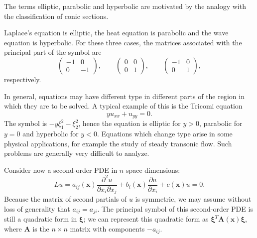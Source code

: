 The terms elliptic, parabolic and hyperbolic are motivated by the analogy with the classification of conic sections.

\begin{Example}
\label{ex:classical-pde-types}
Laplace's equation is elliptic, the heat equation is parabolic and the wave equation is hyperbolic. For these three cases, the matrices associated with the principal part of the symbol are
\begin{equation}\label{eq:classical-principal-matrices}
\begin{pmatrix}-1&0\\0&-1\end{pmatrix},\qquad\begin{pmatrix}0&0\\0&1\end{pmatrix},\qquad\begin{pmatrix}-1&0\\0&1\end{pmatrix},
\end{equation}
respectively.
\end{Example}

\begin{Example}
\label{ex:tricomi-mixed-type}
In general, equations may have different type in different parts of the region in which they are to be solved. A typical example of this is the Tricomi equation
\begin{equation}\label{eq:tricomi-equation}
yu_{xx}+u_{yy}=0.
\end{equation}
The symbol is $-y\xi_1^2-\xi_2^2$, hence the equation is elliptic for $y>0$, parabolic for $y=0$ and hyperbolic for $y<0$. Equations which change type arise in some physical applications, for example the study of steady transonic flow. Such problems are generally very difficult to analyze.
\end{Example}

Consider now a second-order PDE in $n$ space dimensions:
\begin{equation}\label{eq:ndimensional-second-order-equation}
Lu=a_{ij}(\bm{x})\dfrac{\partial^2u}{\partial x_i\partial x_j}+b_i(\bm{x})\dfrac{\partial u}{\partial x_i}+c(\bm{x})u=0.
\end{equation}
Because the matrix of second partials of $u$ is symmetric, we may assume without loss of generality that $a_{ij}=a_{ji}$. The principal symbol of this second-order PDE is still a quadratic form in $\bm{\xi}$; we can represent this quadratic form as $\bm{\xi}^T\bm{A}(\bm{x})\bm{\xi}$, where $\bm{A}$ is the $n\times n$ matrix with components $-a_{ij}$.

